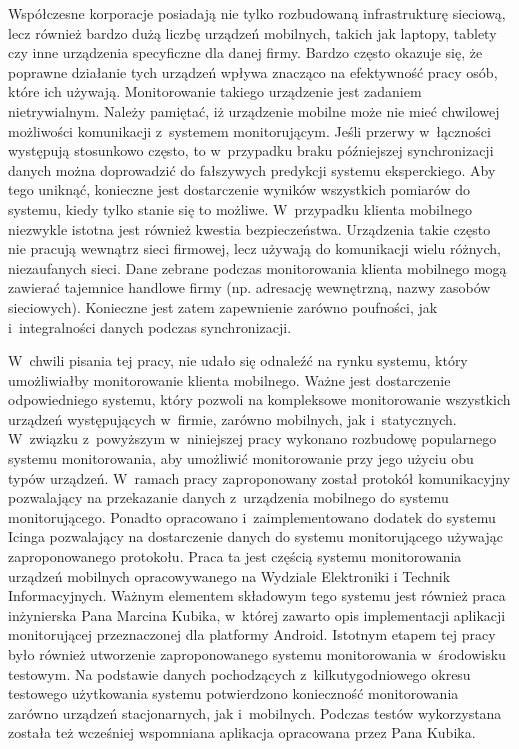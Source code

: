 Współczesne korporacje posiadają nie tylko rozbudowaną infrastrukturę
sieciową, lecz również bardzo dużą liczbę urządzeń mobilnych, takich
jak laptopy, tablety czy inne urządzenia specyficzne dla danej
firmy. Bardzo często okazuje się, że poprawne działanie tych urządzeń
wpływa znacząco na efektywność pracy osób, które ich
używają. Monitorowanie takiego urządzenie jest zadaniem
nietrywialnym. Należy pamiętać, iż urządzenie mobilne może nie mieć
chwilowej możliwości komunikacji z~systemem monitorującym. Jeśli
przerwy w~łączności występują stosunkowo często, to w~przypadku braku
późniejszej synchronizacji danych można doprowadzić do fałszywych
predykcji systemu eksperckiego. Aby tego uniknąć, konieczne jest
dostarczenie wyników wszystkich pomiarów do systemu, kiedy tylko
stanie się to możliwe. W~przypadku klienta mobilnego niezwykle istotna
jest również kwestia bezpieczeństwa. Urządzenia takie często nie
pracują wewnątrz sieci firmowej, lecz używają do komunikacji wielu
różnych, niezaufanych sieci. Dane zebrane podczas monitorowania
klienta mobilnego mogą zawierać tajemnice handlowe firmy
(np. adresację wewnętrzną, nazwy zasobów sieciowych). Konieczne jest
zatem zapewnienie zarówno poufności, jak i~integralności danych podczas
synchronizacji.

W~chwili pisania tej pracy, nie udało się odnaleźć na rynku systemu,
który umożliwiałby monitorowanie klienta mobilnego. Ważne jest
dostarczenie odpowiedniego systemu, który pozwoli na kompleksowe
monitorowanie wszystkich urządzeń występujących w~firmie, zarówno
mobilnych, jak i~statycznych. W~związku z~powyższym w~niniejszej pracy
wykonano rozbudowę popularnego systemu monitorowania, aby umożliwić
monitorowanie przy jego użyciu obu typów urządzeń. W~ramach pracy
zaproponowany został protokół komunikacyjny pozwalający na przekazanie
danych z~urządzenia mobilnego do systemu monitorującego. Ponadto
opracowano i~zaimplementowano dodatek do systemu Icinga pozwalający na
dostarczenie danych do systemu monitorującego używając zaproponowanego
protokołu. Praca ta jest częścią systemu monitorowania urządzeń
mobilnych opracowywanego na Wydziale Elektroniki i Technik
Informacyjnych. Ważnym elementem składowym tego systemu jest również
praca inżynierska Pana Marcina Kubika\cite{book:pracaKubika}, w~której
zawarto opis implementacji aplikacji monitorującej przeznaczonej dla
platformy Android. Istotnym etapem tej pracy było również utworzenie
zaproponowanego systemu monitorowania w~środowisku testowym. Na
podstawie danych pochodzących z~kilkutygodniowego okresu testowego
użytkowania systemu potwierdzono konieczność monitorowania zarówno
urządzeń stacjonarnych, jak i~mobilnych. Podczas testów wykorzystana
została też wcześniej wspomniana aplikacja opracowana przez Pana Kubika.

